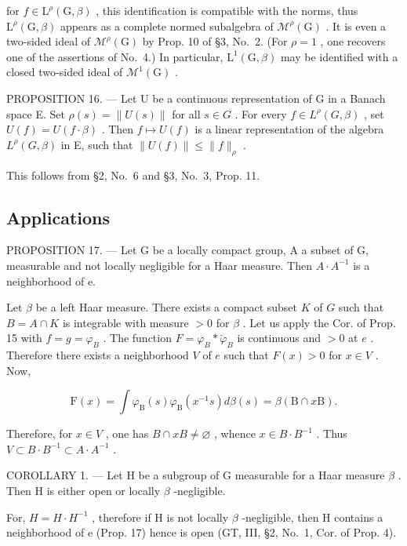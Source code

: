 for \(f \in \mathrm{L}^{\rho}(\mathrm{G},\beta)\) , this identification is compatible with the norms, thus \(\mathrm{L}^{\rho}(\mathrm{G},\beta)\) appears as a complete normed subalgebra of \(\mathcal{M}^{\rho}(\mathrm{G})\) . It is even a two-sided ideal of \(\mathcal{M}^{\rho}(\mathrm{G})\) by Prop. 10 of §3, No.~2. (For \(\rho = 1\) , one recovers one of the assertions of No.~4.) In particular, \(\mathrm{L}^{1}(\mathrm{G},\beta)\) may be identified with a closed two-sided ideal of \(\mathcal{M}^{1}(\mathrm{G})\) .

PROPOSITION 16. --- Let U be a continuous representation of G in a Banach space E. Set \(\rho(s) = \|U(s)\|\) for all \(s \in G\) . For every \(f \in L^{\rho}(G, \beta)\) , set \(U(f) = U(f \cdot \beta)\) . Then \(f \mapsto U(f)\) is a linear representation of the algebra \(L^{\rho}(G, \beta)\) in E, such that \(\|U(f)\| \leqslant \|f\|_{\rho}\) .

This follows from §2, No.~6 and §3, No.~3, Prop. 11.

\subsection{Applications}

PROPOSITION 17. --- Let G be a locally compact group, A a subset of G, measurable and not locally negligible for a Haar measure. Then \(A \cdot A^{-1}\) is a neighborhood of e.

Let \(\beta\) be a left Haar measure. There exists a compact subset \(K\) of \(G\) such that \(B = A \cap K\) is integrable with measure \(>0\) for \(\beta\) . Let us apply the Cor. of Prop. 15 with \(f = g = \varphi_{B}\) . The function \(F = \varphi_{B} * \check{\varphi}_{B}\) is continuous and \(>0\) at \(e\) . Therefore there exists a neighborhood \(V\) of \(e\) such that \(F(x) > 0\) for \(x \in V\) . Now,

\[
\mathrm{F} (x) = \int \varphi_ {\mathrm{B}} (s) \varphi_ {\mathrm{B}} (x ^ {- 1} s) d \beta (s) = \beta (\mathrm{B} \cap x \mathrm{B}).
\]

Therefore, for \(x \in V\) , one has \(B \cap xB \neq \varnothing\) , whence \(x \in B \cdot B^{-1}\) . Thus \(V \subset B \cdot B^{-1} \subset A \cdot A^{-1}\) .

COROLLARY 1. --- Let H be a subgroup of G measurable for a Haar measure \(\beta\) . Then H is either open or locally \(\beta\) -negligible.

For, \(H = H \cdot H^{-1}\) , therefore if H is not locally \(\beta\) -negligible, then H contains a neighborhood of e (Prop. 17) hence is open (GT, III, §2, No.~1, Cor. of Prop. 4).

